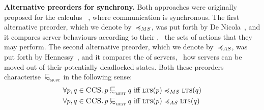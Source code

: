 {\bfseries Alternative preorders for synchrony.}  Both approaches were
originally proposed for %
the calculus \CCS~\cite{DBLP:books/daglib/0098267},
where communication is synchronous.
The first alternative preorder, which we denote by~$\msleq$, was put
forth by De Nicola~\cite{DBLP:journals/tcs/NicolaH84}, and it
compares server behaviours according to their \MustSets, \ie~the sets of
actions that they may perform.
The second alternative preorder, which we denote by~$\asleq$, was put
forth by Hennessy~\cite{DBLP:books/daglib/0066919}, and it compares the
\AcceptanceSets of servers, \ie~how servers can be moved out of their
potentially deadlocked states.
Both these preorders characterise~$\testleqS$ in the
  following sense:
\begin{align}
      \label{eq:bhv-mustset-characterisation}
  \forall \serverA , \serverB \in \CCS \wehavethat & \serverA \testleqS \serverB
  \text{ iff } \ltsof{\serverA} \msleq \ltsof{\serverB}
  \\
    \label{eq:bhv-accset-characterisation}
  \forall \serverA , \serverB \in \CCS \wehavethat & \serverA \testleqS \serverB
  \text{ iff } \ltsof{\serverA} \asleq \ltsof{\serverB}
\end{align}


